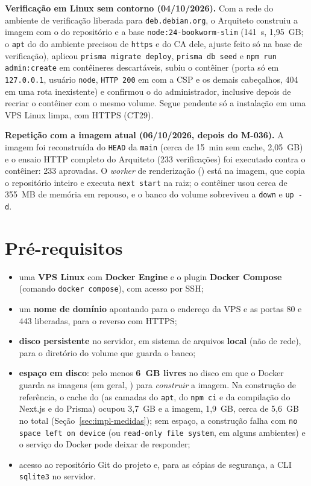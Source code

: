 \textbf{Verificação em Linux sem contorno (04/10/2026).} Com a rede do ambiente de verificação liberada para \texttt{deb.debian.org}, o Arquiteto construiu a imagem com o  do repositório e a base \texttt{node:24-bookworm-slim} (141~s, 1,95~GB; o \texttt{apt} do  do ambiente precisou de \texttt{https} e do CA dele, ajuste feito só na base de verificação), aplicou \texttt{prisma migrate deploy}, \texttt{prisma db seed} e \texttt{npm run admin:create} em contêineres descartáveis, subiu o contêiner (porta só em \texttt{127.0.0.1}, usuário \texttt{node}, \texttt{HTTP 200} em  com a CSP e os demais cabeçalhos, 404 em uma rota inexistente) e confirmou o  do administrador, inclusive depois de recriar o contêiner com o mesmo volume. Segue pendente só a instalação em uma VPS Linux limpa, com HTTPS (CT29).

\textbf{Repetição com a imagem atual (06/10/2026, depois do M-036).} A imagem foi reconstruída do \texttt{HEAD} da \texttt{main} (cerca de 15~min sem cache, 2,05~GB) e o ensaio HTTP completo do Arquiteto (233 verificações) foi executado contra o contêiner: 233 aprovadas. O \emph{worker} de renderização () está na imagem, que copia o repositório inteiro e executa \texttt{next start} na raiz; o contêiner usou cerca de 355~MB de memória em repouso, e o banco do volume sobreviveu a \texttt{down} e \texttt{up -d}.

\section{Pré-requisitos}

\begin{itemize}
  \item uma \textbf{VPS Linux} com \textbf{Docker Engine} e o plugin \textbf{Docker Compose} (comando \texttt{docker compose}), com acesso por SSH;
  \item um \textbf{nome de domínio} apontando para o endereço da VPS e as portas 80 e 443 liberadas, para o  reverso com HTTPS;
  \item \textbf{disco persistente} no servidor, em sistema de arquivos \textbf{local} (não de rede), para o diretório do volume que guarda o banco;
  \item \textbf{espaço em disco}: pelo menos \textbf{6~GB livres} no disco em que o Docker guarda as imagens (em geral, ) para \emph{construir} a imagem. Na construção de referência, o cache do  (as camadas do \texttt{apt}, do \texttt{npm ci} e da compilação do Next.js e do Prisma) ocupou 3,7~GB e a imagem, 1,9~GB, cerca de 5,6~GB no total (Seção~\ref{sec:impl-medidas}); sem espaço, a construção falha com \texttt{no space left on device} (ou \texttt{read-only file system}, em alguns ambientes) e o serviço do Docker pode deixar de responder;
  \item acesso ao repositório Git do projeto e, para as cópias de segurança, a CLI \texttt{sqlite3} no servidor.
\end{itemize}

